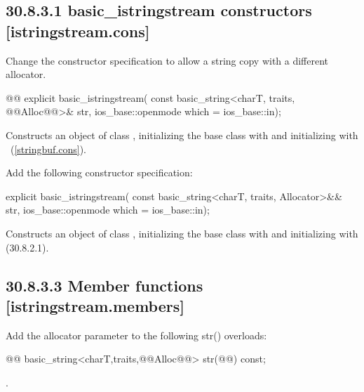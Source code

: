 \documentclass[ebook,11pt,article]{memoir}
\begin{document}
\subsection{30.8.3.1 basic\_istringstream constructors [istringstream.cons]}
Change the constructor specification to allow a string copy with a different allocator.
\begin{itemdecl}
@@
explicit basic_istringstream(
  const basic_string<charT, traits, @@Alloc@@>& str,
  ios_base::openmode which = ios_base::in);
\end{itemdecl}

\begin{itemdescr}
\pnum
\effects
Constructs an object of class
,
initializing the base class with
and initializing  with
~(\ref{stringbuf.cons}).
\end{itemdescr}


Add the following constructor specification:

\begin{addedblock}
\begin{itemdecl}
explicit basic_istringstream(
  const basic_string<charT, traits, Allocator>&& str,
  ios_base::openmode which = ios_base::in);
\end{itemdecl}
\begin{itemdescr}
\pnum
\effects Constructs an object of class , initializing the base class with  and initializing  with  (30.8.2.1).
\end{itemdescr}
\end{addedblock}


\subsection{30.8.3.3 Member functions [istringstream.members]}
Add the allocator parameter to the following str() overloads:
\begin{itemdecl}
@@
basic_string<charT,traits,@@Alloc@@> str(@@) const;
\end{itemdecl}
\begin{itemdescr}
\pnum
\returns
{}.
\end{itemdescr}
\end{document}
